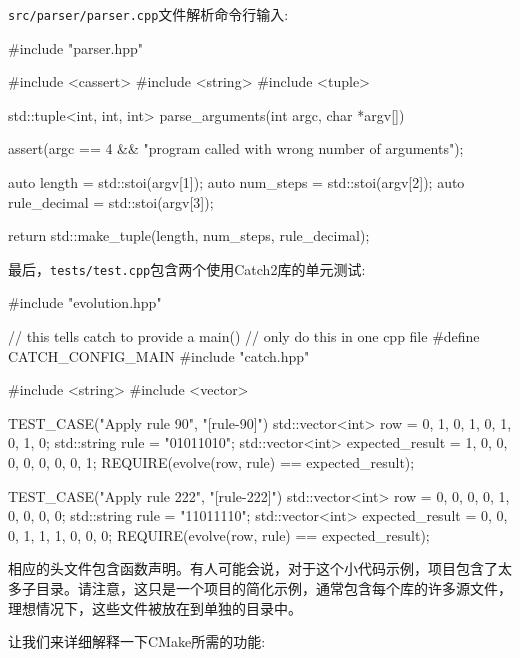 \texttt{src/parser/parser.cpp}文件解析命令行输入:

\begin{codebox}[cpp]
#include "parser.hpp"

#include <cassert>
#include <string>
#include <tuple>

std::tuple<int, int, int> parse_arguments(int argc, char *argv[]) {
  assert(argc == 4 && "program called with wrong number of arguments");
  
  auto length = std::stoi(argv[1]);
  auto num_steps = std::stoi(argv[2]);
  auto rule_decimal = std::stoi(argv[3]);
  
  return std::make_tuple(length, num_steps, rule_decimal);
}
\end{codebox}

最后，\texttt{tests/test.cpp}包含两个使用Catch2库的单元测试:

\begin{codebox}[cpp]
#include "evolution.hpp"

// this tells catch to provide a main()
// only do this in one cpp file
#define CATCH_CONFIG_MAIN
#include "catch.hpp"

#include <string>
#include <vector>

TEST_CASE("Apply rule 90", "[rule-90]") {
  std::vector<int> row = {0, 1, 0, 1, 0, 1, 0, 1, 0};
  std::string rule = "01011010";
  std::vector<int> expected_result = {1, 0, 0, 0, 0, 0, 0, 0, 1};
  REQUIRE(evolve(row, rule) == expected_result);
}

TEST_CASE("Apply rule 222", "[rule-222]") {
  std::vector<int> row = {0, 0, 0, 0, 1, 0, 0, 0, 0};
  std::string rule = "11011110";
  std::vector<int> expected_result = {0, 0, 0, 1, 1, 1, 0, 0, 0};
  REQUIRE(evolve(row, rule) == expected_result);
}
\end{codebox}

相应的头文件包含函数声明。有人可能会说，对于这个小代码示例，项目包含了太多子目录。请注意，这只是一个项目的简化示例，通常包含每个库的许多源文件，理想情况下，这些文件被放在到单独的目录中。


让我们来详细解释一下CMake所需的功能:

